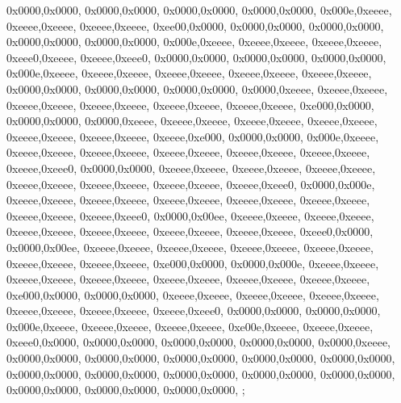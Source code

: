 {	0x0000,0x0000,
	0x0000,0x0000,
	0x0000,0x0000,
	0x0000,0x0000,
	0x000e,0xeeee,
	0xeeee,0xeeee,
	0xeeee,0xeeee,
	0xee00,0x0000,
	0x0000,0x0000,
	0x0000,0x0000,
	0x0000,0x0000,
	0x0000,0x0000,
	0x000e,0xeeee,
	0xeeee,0xeeee,
	0xeeee,0xeeee,
	0xeee0,0xeeee,
	0xeeee,0xeee0,
	0x0000,0x0000,
	0x0000,0x0000,
	0x0000,0x0000,
	0x000e,0xeeee,
	0xeeee,0xeeee,
	0xeeee,0xeeee,
	0xeeee,0xeeee,
	0xeeee,0xeeee,
	0x0000,0x0000,
	0x0000,0x0000,
	0x0000,0x0000,
	0x0000,0xeeee,
	0xeeee,0xeeee,
	0xeeee,0xeeee,
	0xeeee,0xeeee,
	0xeeee,0xeeee,
	0xeeee,0xeeee,
	0xe000,0x0000,
	0x0000,0x0000,
	0x0000,0xeeee,
	0xeeee,0xeeee,
	0xeeee,0xeeee,
	0xeeee,0xeeee,
	0xeeee,0xeeee,
	0xeeee,0xeeee,
	0xeeee,0xe000,
	0x0000,0x0000,
	0x000e,0xeeee,
	0xeeee,0xeeee,
	0xeeee,0xeeee,
	0xeeee,0xeeee,
	0xeeee,0xeeee,
	0xeeee,0xeeee,
	0xeeee,0xeee0,
	0x0000,0x0000,
	0xeeee,0xeeee,
	0xeeee,0xeeee,
	0xeeee,0xeeee,
	0xeeee,0xeeee,
	0xeeee,0xeeee,
	0xeeee,0xeeee,
	0xeeee,0xeee0,
	0x0000,0x000e,
	0xeeee,0xeeee,
	0xeeee,0xeeee,
	0xeeee,0xeeee,
	0xeeee,0xeeee,
	0xeeee,0xeeee,
	0xeeee,0xeeee,
	0xeeee,0xeee0,
	0x0000,0x00ee,
	0xeeee,0xeeee,
	0xeeee,0xeeee,
	0xeeee,0xeeee,
	0xeeee,0xeeee,
	0xeeee,0xeeee,
	0xeeee,0xeeee,
	0xeee0,0x0000,
	0x0000,0x00ee,
	0xeeee,0xeeee,
	0xeeee,0xeeee,
	0xeeee,0xeeee,
	0xeeee,0xeeee,
	0xeeee,0xeeee,
	0xeeee,0xeeee,
	0xe000,0x0000,
	0x0000,0x000e,
	0xeeee,0xeeee,
	0xeeee,0xeeee,
	0xeeee,0xeeee,
	0xeeee,0xeeee,
	0xeeee,0xeeee,
	0xeeee,0xeeee,
	0xe000,0x0000,
	0x0000,0x0000,
	0xeeee,0xeeee,
	0xeeee,0xeeee,
	0xeeee,0xeeee,
	0xeeee,0xeeee,
	0xeeee,0xeeee,
	0xeeee,0xeee0,
	0x0000,0x0000,
	0x0000,0x0000,
	0x000e,0xeeee,
	0xeeee,0xeeee,
	0xeeee,0xeeee,
	0xe00e,0xeeee,
	0xeeee,0xeeee,
	0xeee0,0x0000,
	0x0000,0x0000,
	0x0000,0x0000,
	0x0000,0x0000,
	0x0000,0xeeee,
	0x0000,0x0000,
	0x0000,0x0000,
	0x0000,0x0000,
	0x0000,0x0000,
	0x0000,0x0000,
	0x0000,0x0000,
	0x0000,0x0000,
	0x0000,0x0000,
	0x0000,0x0000,
	0x0000,0x0000,
	0x0000,0x0000,
	0x0000,0x0000,
	0x0000,0x0000,
};
